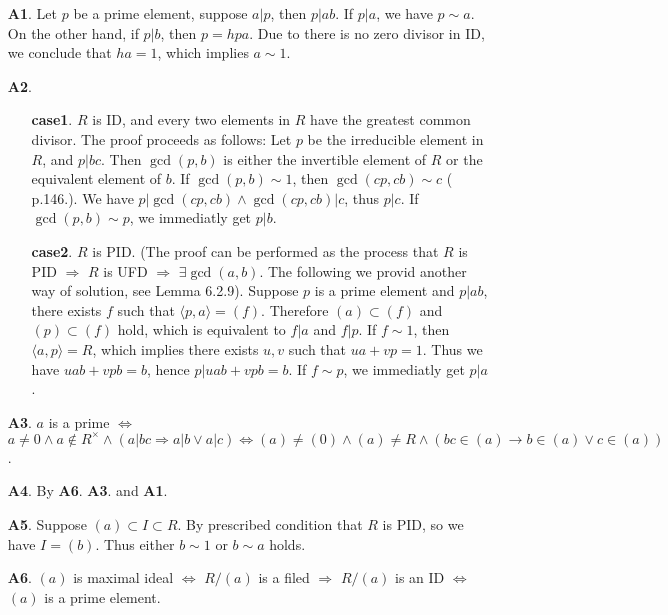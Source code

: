 


\begin{enumerate}
    \item[\textbf{A1}.] Let $p$ be a prime element, suppose $a | p$, then $p | ab$. If $p | a$, we have $p \sim a$. On the other hand, if $p | b$, then $p = hpa$. Due to there is no zero divisor in ID, we conclude that $ha = 1$, which implies $a \sim 1$.
    

    \item[\textbf{A2}.]
    \begin{enumerate}
        \item[\textbf{case1}.] $R$ is ID, and every two elements in $R$ have the greatest common divisor. The proof proceeds as follows: Let $p$ be the irreducible element in $R$, and $p | bc$. Then $\gcd(p, b)$ is either the invertible element of $R$ or the equivalent element of $b$. If $\gcd(p, b) \sim 1$, then $\gcd(cp, cb) \sim c$ (\cite{Qiu_MA} p.146.). We have $p | \gcd(cp, cb) \land \gcd(cp, cb) | c$, thus $p | c$. If $\gcd(p, b) \sim p$, we immediatly get $p | b$.
        \item[\textbf{case2}.] $R$ is PID. (The proof can be performed as the process that $R$ is PID $\Rightarrow$ $R$ is UFD $\Rightarrow$ $\exists \gcd(a, b)$. The following we provid another way of solution, see \cite{LWW_AJN} Lemma 6.2.9). Suppose $p$ is a prime element and $p|ab$, there exists $f$ such that $\langle p, a \rangle = (f)$. Therefore $(a) \subset (f)$ and $(p) \subset (f)$ hold, which is equivalent to $f|a$ and $f|p$. If $f \sim 1$, then $\langle a, p \rangle = R$, which implies there exists $u, v$ such that $ua + vp = 1$. Thus we have $uab + vpb = b$, hence $p | uab + vpb = b$. If $f \sim p$, we immediatly get $p | a$.
    \end{enumerate}


    \item[\textbf{A3}.] $a$ is a prime $\Leftrightarrow$ $a \neq 0 \land a \notin R^{\times} \land (a|bc \Rightarrow a|b \lor a|c ) \Leftrightarrow (a) \neq (0) \land (a) \neq R \land (bc \in (a) \rightarrow b \in (a) \lor c \in (a))$.
    \item[\textbf{A4}.] By \textbf{A6}. \textbf{A3}. and \textbf{A1}.
    \item[\textbf{A5}.] Suppose $(a) \subset I \subset R$. By prescribed condition that $R$ is PID, so we have $I = (b)$. Thus either $b \sim 1$ or $b \sim a$ holds.
    \item[\textbf{A6}.] $(a)$ is maximal ideal $\Leftrightarrow$ $R/(a)$ is a filed $\Rightarrow$ $R/(a)$ is an ID $\Leftrightarrow$ $(a)$ is a prime element. 
    


\end{enumerate}
